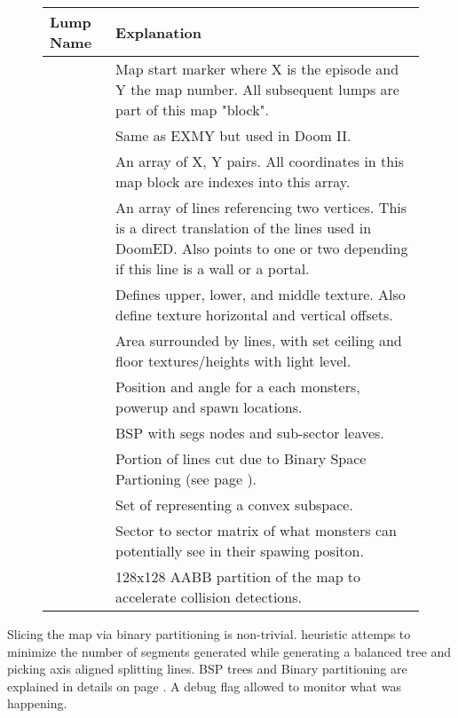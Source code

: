\par
 \begin{figure}[H]
\centering  
\begin{tabularx}{\textwidth}{ L{0.15} L{0.75} }
  \toprule
  \textbf{Lump Name} &  \textbf{Explanation} \\
  \toprule 
   
    & Map start marker where X is the episode and Y the map number. All subsequent lumps are part of this map "block".\\
    & Same as EXMY but used in Doom II.\\
    & An array of  X, Y pairs. All coordinates in this map block are indexes into this array.\\
    & An array of lines referencing two vertices. This is a direct translation of the lines used in DoomED. Also points to one or two  depending if this line is a wall or a portal. \\
    & Defines upper, lower, and middle texture. Also define texture horizontal and vertical offsets.\\
    & Area surrounded by lines, with set ceiling and floor textures/heights with light level.\\
    & Position and angle for a each monsters, powerup and spawn locations.\\
   \toprule
    & BSP with segs nodes and sub-sector leaves.\\
    & Portion of lines cut due to Binary Space Partioning (see page \pageref{Binary Space Partitioning: Theory}).\\
    & Set of  representing a convex subspace.\\
   \toprule
    & Sector to sector matrix of what monsters can potentially see in their spawing positon.\\
   \toprule
    & 128x128 AABB partition of the map  to accelerate collision detections.\\
   \toprule
\end{tabularx}
\end{figure}
\par
{}

Slicing the map via binary partitioning is non-trivial.  heuristic attemps to minimize the number of segments generated while generating a balanced tree and picking axis aligned splitting lines. BSP trees and Binary partitioning are explained in details on page \pageref{Binary Space Partitioning: Theory}. A debug flag  allowed to monitor what was happening.\\
\par
{}
\par

